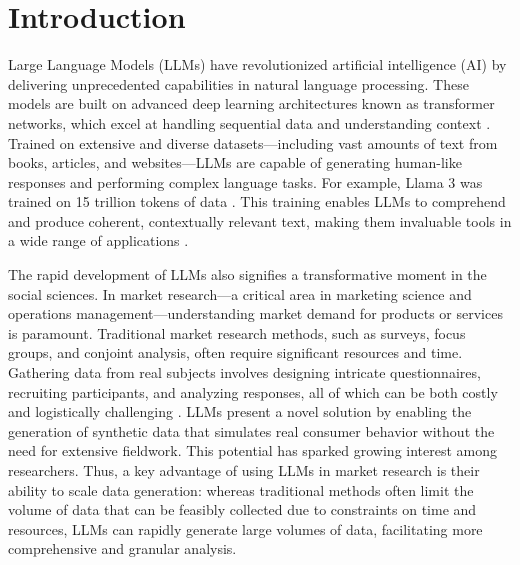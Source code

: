 \section{Introduction}
\label{sec:intro}

Large Language Models (LLMs) have revolutionized artificial intelligence (AI) by delivering unprecedented capabilities in natural language processing. These models are built on advanced deep learning architectures known as transformer networks, which excel at handling sequential data and understanding context \citep{vaswani2017attention,radford2018improving}. Trained on extensive and diverse datasets—including vast amounts of text from books, articles, and websites—LLMs are capable of generating human-like responses and performing complex language tasks. For example, Llama 3 was trained on 15 trillion tokens of data \citep{llama}. This training enables LLMs to comprehend and produce coherent, contextually relevant text, making them invaluable tools in a wide range of applications \citep{brown2020language}.

The rapid development of LLMs also signifies a transformative moment in the social sciences. In market research—a critical area in marketing science and operations management—understanding market demand for products or services is paramount. Traditional market research methods, such as surveys, focus groups, and conjoint analysis, often require significant resources and time. Gathering data from real subjects involves designing intricate questionnaires, recruiting participants, and analyzing responses, all of which can be both costly and logistically challenging \citep{hair2019essentials}. LLMs present a novel solution by enabling the generation of synthetic data that simulates real consumer behavior without the need for extensive fieldwork. This potential has sparked growing interest among researchers. Thus, a key advantage of using LLMs in market research is their ability to scale data generation: whereas traditional methods often limit the volume of data that can be feasibly collected due to constraints on time and resources, LLMs can rapidly generate large volumes of data, facilitating more comprehensive and granular analysis.
 
